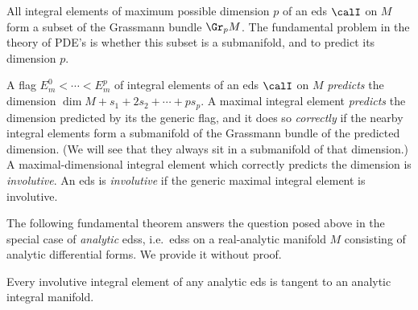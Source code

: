 All integral elements of maximum possible dimension $p$ of an \gls{eds} $\calI$ on $M$ form a subset of the Grassmann bundle $\Gr_p M$. The fundamental problem in the theory of PDE's is whether this subset is a submanifold, and to predict its dimension $p$.

\begin{defn}
    A flag $E^0_m<\cdots <E^p_m$ of integral elements of an \gls{eds} $\calI$ on $M$ \emph{predicts} the dimension $\dim M+s_1+2s_2+\cdots+p s_p$. A maximal integral element \emph{predicts} the dimension predicted by its the generic flag, and it does so \emph{correctly} if the nearby integral elements form a submanifold of the Grassmann bundle of the predicted dimension. (We will see that they always sit in a submanifold of that dimension.) A maximal-dimensional integral element which correctly predicts the dimension is \emph{involutive}. An \gls{eds} is \emph{involutive} if the generic maximal integral element is involutive.
\end{defn}

The following fundamental theorem answers the question posed above in the special case of \emph{analytic} \glspl{eds}, i.e.\ \glspl{eds} on a real-analytic manifold $M$ consisting of analytic differential forms. We provide it without proof.

\begin{thm}\label{thm Cartan-Kahler}
    Every involutive integral element of any analytic \gls{eds} is tangent to an analytic integral manifold.
\end{thm}

